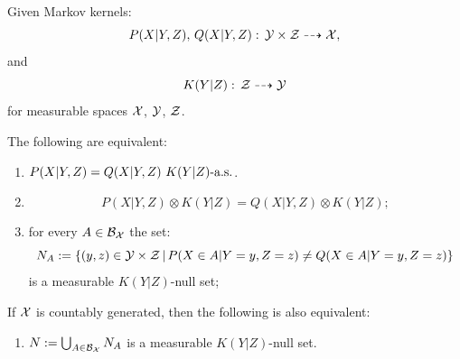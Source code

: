 \begin{Lem}
  Given Markov kernels:    
  \[P(X|Y,Z),\,Q(X|Y,Z):\, \mathcal{Y}\times \mathcal{Z} \dashrightarrow \mathcal{X},\]
  and 
  \[K(Y|Z):\,\mathcal{Z} \dashrightarrow \mathcal{Y}\]
  for measurable spaces $\mathcal{X}$, $\mathcal{Y}$, $\mathcal{Z}$.
 
  The following are equivalent:
  \begin{enumerate}[label=\roman*)]
    \item $P(X|Y,Z) = Q(X|Y,Z)\ K(Y|Z)\as$.     
    \item $$ P(X|Y,Z) \otimes K(Y|Z) = Q(X|Y,Z) \otimes K(Y|Z); $$
    \item for every $A \in \mathcal{B}_{\mathcal{X}}$ the set:
    \[N_A := \left \{ (y,z) \in \mathcal{Y} \times \mathcal{Z} \,|\, P(X \in A|Y=y,Z=z) \neq Q(X \in A|Y=y,Z=z)\right \}\]
     is a measurable $K(Y|Z)$-null set;
  \end{enumerate}
  If $\mathcal{X}$ is countably generated, then the following is also equivalent:
  \begin{enumerate}[resume*]
    \item $N := \bigcup_{A \in \mathcal{B}_{\mathcal{X}}} N_A$ is a measurable $K(Y|Z)$-null set.
  \end{enumerate}
\end{Lem}
